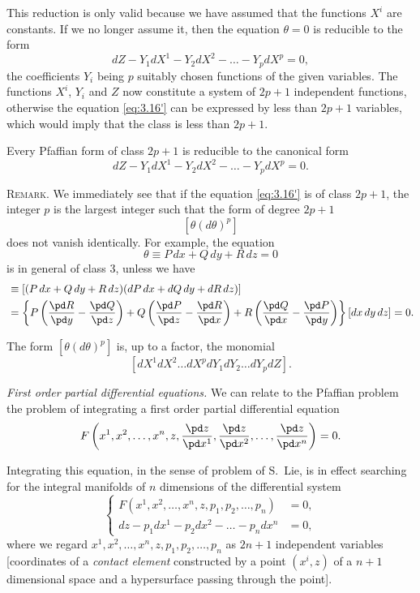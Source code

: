 This reduction is only valid because we have assumed that the functions $X^{i}$ are constants. If we no longer assume it, then the equation $\theta=0$ is reducible to the form
\[
dZ-Y_{1}dX^{1}-Y_{2}dX^{2}-\dots-Y_{p}dX^{p}=0,
\]
the coefficients $Y_{i}$ being $p$ suitably chosen functions of the given variables. The functions $X^{i}$, $Y_{i}$ and $Z$ now constitute a system of $2p+1$ independent functions, otherwise the equation \eqref{eq:3.16'} can be expressed by  less than $2p+1$ variables, which would imply that the class is less than $2p+1$.

\begin{thm*}
  Every Pfaffian form of class $2p+1$ is reducible to the canonical form
\[
dZ-Y_{1}dX^{1}-Y_{2}dX^{2}-\dots-Y_{p}dX^{p}=0.
\]
\end{thm*}


\vspace{12pt}\fsec  \textsc{Remark.} {We immediately see that if the equation \eqref{eq:3.16'} is of class $2p+1$, the integer $p$ is the largest integer such that the form of degree $2p+1$}
\[
[\theta(d\theta)^{p}]
\]
{does not  vanish identically. For example, the equation}
\[
\theta\equiv P\,dx+Q\,dy+R\,dz=0
\]
{is in  general  of class $3$, unless we have}
\begin{align*}
  [\theta d\theta]&\equiv[(P\,dx+Q\,dy+R\,dz)(dP\,dx+dQ\,dy+dR\,dz)]\\
&=\left\{P\left(\frac{\pd R}{\pd y}-\frac{\pd Q}{\pd z}\right)+Q\left(\frac{\pd P}{\pd z}-\frac{\pd R}{\pd x}\right)+R\left(\frac{\pd Q}{\pd x}-\frac{\pd P}{\pd y}\right)\right\}[dx\,dy\,dz]=0.
\end{align*}

{The form $[\theta(d\theta)^{p}]$ is, up to a  factor,  the monomial}\[
[dX^{1}dX^{2}\dots dX^{p}dY_{1}dY_{2}\dots dY_{p}dZ].
\]


\vspace{12pt}\fsec \emph{First order partial differential equations.} We can relate to the Pfaffian problem the problem of integrating a first order partial differential equation
\begin{equation}
  \label{eq:3.16}
  F\left(x^{1},x^{2},\dots,x^{n},z,\frac{\pd z}{\pd x^{1}},\frac{\pd z}{\pd x^{2}},\dots,\frac{\pd z}{\pd x^{n}}\right)=0.
\end{equation}

Integrating this equation, in the sense of problem of S.~Lie, is in effect  searching for the integral manifolds of $n$ dimensions of the differential system
\begin{equation}
  \label{eq:3.17}
  \left\{
    \begin{aligned}
      F(x^{1},x^{2},\dots,x^{n},z,p_{1},p_{2},\dots,p_{n})&=0,\\
      dz-p_{1}dx^{1}-p_{2}dx^{2}-\dots-p_{n}dx^{n}&=0,
    \end{aligned}
  \right.
\end{equation}
where we regard $x^{1},x^{2},\dots,x^{n},z,p_{1},p_{2},\dots,p_{n}$ as $2n+1$ independent variables [coordinates of a \emph{contact element} constructed by a point $(x^{i},z)$ of a $n+1$ dimensional space and a hypersurface passing through the point].

